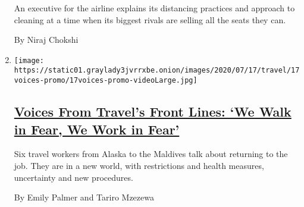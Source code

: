 \begin{enumerate}
  An executive for the airline explains its distancing practices and
  approach to cleaning at a time when its biggest rivals are selling all
  the seats they can.

  By Niraj Chokshi
\item
  \texttt{[image: https://static01.graylady3jvrrxbe.onion/images/2020/07/17/travel/17voices-promo/17voices-promo-videoLarge.jpg]}

  \hypertarget{voices-from-travels-front-lines-we-walk-in-fear-we-work-in-fear}{%
  \subsection{\texorpdfstring{\href{/2020/07/17/travel/coronavirus-travel-hospitality-workers.html}{Voices
  From Travel's Front Lines: `We Walk in Fear, We Work in
  Fear'}}{Voices From Travel's Front Lines: `We Walk in Fear, We Work in Fear'}}\label{voices-from-travels-front-lines-we-walk-in-fear-we-work-in-fear}}

  Six travel workers from Alaska to the Maldives talk about returning to
  the job. They are in a new world, with restrictions and health
  measures, uncertainty and new procedures.

  By Emily Palmer and Tariro Mzezewa
\end{enumerate}

